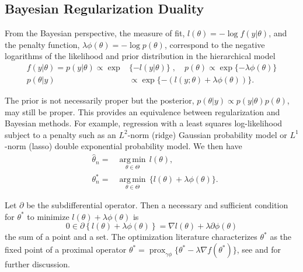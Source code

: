\documentclass[11pt]{article}%
\newcommand{\prox}{ \mathop{\mathrm{prox}} }
\DeclareMathOperator*{\argmin}{arg\,min} %
\begin{document}
\subsection{Bayesian Regularization Duality}

From the Bayesian perspective, the measure of fit, $l(\theta) = - \log f(y|\theta)$, and the penalty function, $\lambda\phi(\theta)= - \log p(\theta )$, correspond to the negative logarithms of the likelihood and prior distribution in the hierarchical model
\begin{align*}
f(y | \theta) = p(y | \theta) \propto \exp & \{-  l(y|\theta)\} \; , \quad p(\theta) \propto \exp\{ - \lambda\phi(\theta) \} \\
p( \theta | y ) &  \propto \exp\{- ( l(y;\theta) + \lambda\phi(\theta) ) \}.
\end{align*}


\noindent The prior is not necessarily proper but the posterior, $p(\theta | y) \propto p(y | \theta) p(\theta)$, may still be proper. This provides an equivalence between regularization and Bayesian methods. For example, regression with a least squares log-likelihood subject to a penalty such as an $L^2$-norm (ridge) Gaussian probability model or $ L^1$-norm (lasso) double exponential probability model. We then have
\begin{eqnarray}
&\hat\theta_n =& \underset{\theta \in \Theta}{\argmin}\, l(\theta),\\
&\theta^*_n =& \underset{\theta \in \Theta}{\argmin}\,  \{ l(\theta) + \lambda\phi(\theta) \}.  \label{posterior mode}
\end{eqnarray}

\noindent Let $\partial$ be the subdifferential operator.  Then a necessary and sufficient condition for $\theta^*$ to minimize $ l(\theta) + \lambda\phi(\theta)$  is 
\begin{equation}
\label{eqn:subdiffproxgrad}
0 \in \partial \left\{ l(\theta) + \lambda\phi(\theta)\right\} = \nabla l(\theta) + \lambda\partial \phi(\theta) 
\end{equation}
the sum of a point and a set.  The optimization literature  characterizes $\theta^*$ as the fixed point of a proximal operator
$\theta^* = \prox_{\gamma \phi}\{ \theta^* - \lambda \nabla f(\theta^*) \} $, see \cite{polson2015mixtures} and \cite*{polson2015proximal} for further discussion. \\
\end{document}
